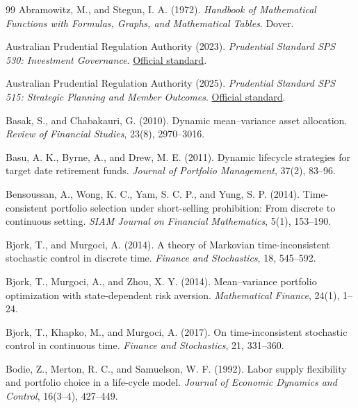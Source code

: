 \documentclass[10pt,a4paper]{article}
\theoremstyle{plain}
\theoremstyle{definition}
\begin{document}
\begingroup
\footnotesize
\setlength{\bibsep}{1pt}
\begin{thebibliography}{99}
\footnotesize
{}
Abramowitz, M., and Stegun, I. A. (1972).
\emph{Handbook of Mathematical Functions with Formulas, Graphs, and Mathematical Tables}.
Dover.

Australian Prudential Regulation Authority (2023).
\emph{Prudential Standard SPS 530: Investment Governance}.
\href{https://www.apra.gov.au/standards/sps-530}{Official standard}.

Australian Prudential Regulation Authority (2025).
\emph{Prudential Standard SPS 515: Strategic Planning and Member Outcomes}.
\href{https://www.apra.gov.au/standards/sps-515}{Official standard}.

Basak, S., and Chabakauri, G. (2010).
Dynamic mean--variance asset allocation.
\emph{Review of Financial Studies}, 23(8), 2970--3016.

Basu, A. K., Byrne, A., and Drew, M. E. (2011).
Dynamic lifecycle strategies for target date retirement funds.
\emph{Journal of Portfolio Management}, 37(2), 83--96.

Bensoussan, A., Wong, K. C., Yam, S. C. P., and Yung, S. P. (2014).
Time-consistent portfolio selection under short-selling prohibition: From discrete to continuous setting.
\emph{SIAM Journal on Financial Mathematics}, 5(1), 153--190.

Bjork, T., and Murgoci, A. (2014).
A theory of Markovian time-inconsistent stochastic control in discrete time.
\emph{Finance and Stochastics}, 18, 545--592.

Bjork, T., Murgoci, A., and Zhou, X. Y. (2014).
Mean--variance portfolio optimization with state-dependent risk aversion.
\emph{Mathematical Finance}, 24(1), 1--24.

Bjork, T., Khapko, M., and Murgoci, A. (2017).
On time-inconsistent stochastic control in continuous time.
\emph{Finance and Stochastics}, 21, 331--360.

Bodie, Z., Merton, R. C., and Samuelson, W. F. (1992).
Labor supply flexibility and portfolio choice in a life-cycle model.
\emph{Journal of Economic Dynamics and Control}, 16(3--4), 427--449.


\end{thebibliography}
\end{document}
